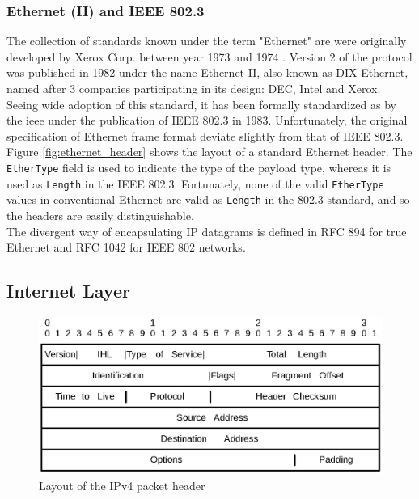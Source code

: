 \subsubsection{Ethernet (II) and IEEE 802.3}
The collection of standards known under the term "Ethernet" are were originally
developed by Xerox Corp. between year 1973 and 1974\cite{americanhistory_ethernet}
\cite{tcpip_illustrated_vol1}. Version 2 of the protocol was published in 1982
under the name Ethernet II, also known as DIX Ethernet, named after 3 companies
participating in its design: DEC, Intel and Xerox\cite{heywood2001drew}.\\
Seeing wide adoption of this standard, it has been formally standardized as by
the \gls{ieee} under the publication of IEEE 802.3 in
1983\cite{ieee_8023_release}. Unfortunately, the original specification of
Ethernet frame format deviate slightly from that of IEEE
802.3\cite{tcpip_illustrated_vol1}. Figure \ref{fig:ethernet_header} shows the
layout of a standard Ethernet header. The \texttt{EtherType} field is used to
indicate the type of the payload type, whereas it is used as \texttt{Length} in
the IEEE 802.3. Fortunately, none of the valid \texttt{EtherType} values in
conventional Ethernet are valid as \texttt{Length} in the 802.3 standard, and
so the headers are easily distinguishable.\\
The divergent way of encapsulating IP datagrams is defined in RFC 894 for
true Ethernet\cite{RFC0894} and RFC 1042 for IEEE 802 networks\cite{RFC1042}.



\subsection{Internet Layer}
\begin{figure}
\includegraphics[scale=0.55]{background/ip.eps}
\caption{Layout of the IPv4 packet header}
\label{fig:ipv4_header}
\end{figure}

